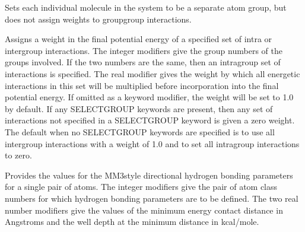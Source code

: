 \documentclass[letterpaper,11pt,english]{sphinxmanual}
\begin{document}
\ignorespaces {}\label{\detokenize{text/keywords:key-group-molecule}}\begin{description}
\sphinxAtStartPar
Sets each individual molecule in the system to be a separate atom group, but does not assign weights to group\sphinxhyphen{}group interactions.

\end{description}

\ignorespaces {}\label{\detokenize{text/keywords:key-group-select}}\begin{description}
\sphinxAtStartPar
Assigns a weight in the final potential energy of a specified set of intra\sphinxhyphen{} or intergroup interactions. The integer modifiers give the group numbers of the groups involved. If the two numbers are the same, then an intragroup set of interactions is specified. The real modifier gives the weight by which all energetic interactions in this set will be multiplied before incorporation into the final potential energy. If omitted as a keyword modifier, the weight will be set to 1.0 by default. If any SELECT\sphinxhyphen{}GROUP keywords are present, then any set of interactions not specified in a SELECT\sphinxhyphen{}GROUP keyword is given a zero weight. The default when no SELECT\sphinxhyphen{}GROUP keywords are specified is to use all intergroup interactions with a weight of 1.0 and to set all intragroup interactions to zero.

\end{description}

\ignorespaces {}\label{\detokenize{text/keywords:key-hbond}}\begin{description}
\sphinxAtStartPar
Provides the values for the MM3\sphinxhyphen{}style directional hydrogen bonding parameters for a single pair of atoms. The integer modifiers give the pair of atom class numbers for which hydrogen bonding parameters are to be defined. The two real number modifiers give the values of the minimum energy contact distance in Angstroms and the well depth at the minimum distance in kcal/mole.

\end{description}
\end{document}
